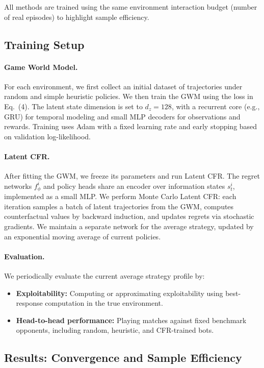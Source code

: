 \documentclass{article}
\begin{document}
All methods are trained using the same environment interaction budget (number of real episodes) to highlight sample efficiency.

\subsection{Training Setup}

\paragraph{Game World Model.}
For each environment, we first collect an initial dataset of trajectories under random and simple heuristic policies. We then train the GWM using the loss in Eq.~(4). The latent state dimension is set to $d_z = 128$, with a recurrent core (e.g., GRU) for temporal modeling and small MLP decoders for observations and rewards. Training uses Adam with a fixed learning rate and early stopping based on validation log-likelihood.

\paragraph{Latent CFR.}
After fitting the GWM, we freeze its parameters and run Latent CFR. The regret networks $f_\phi^i$ and policy heads share an encoder over information states $s^i_t$, implemented as a small MLP. We perform Monte Carlo Latent CFR: each iteration samples a batch of latent trajectories from the GWM, computes counterfactual values by backward induction, and updates regrets via stochastic gradients. We maintain a separate network for the average strategy, updated by an exponential moving average of current policies.

\paragraph{Evaluation.}
We periodically evaluate the current average strategy profile by:
\begin{itemize}
    \item \textbf{Exploitability:} Computing or approximating exploitability using best-response computation in the true environment.
    \item \textbf{Head-to-head performance:} Playing matches against fixed benchmark opponents, including random, heuristic, and CFR-trained bots.
\end{itemize}

\subsection{Results: Convergence and Sample Efficiency}
\end{document}

